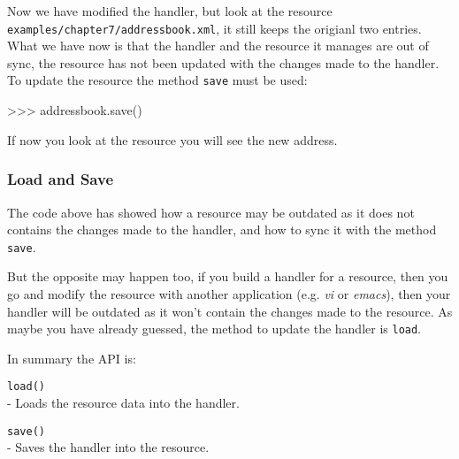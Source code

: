 Now we have modified the handler, but look at the resource
{\tt examples/chapter7/addressbook.xml}, it still keeps the origianl two
entries. What we have now is that the handler and the resource it manages
are out of sync, the resource has not been updated with the changes made
to the handler. To update the resource the method {\tt save} must be used:

\begin{code}
    >>> addressbook.save()
\end{code}

If now you look at the resource you will see the new address.


\subsubsection{Load and Save}

The code above has showed how a resource may be outdated as it does not
contains the changes made to the handler, and how to sync it with the
method {\tt save}.

But the opposite may happen too, if you build a handler for a resource,
then you go and modify the resource with another application (e.g. {\em vi}
or {\em emacs}), then your handler will be outdated as it won't contain the
changes made to the resource. As maybe you have already guessed, the method
to update the handler is {\tt load}.

In summary the API is:

\begin{api}
  {\tt load()}\\
  - Loads the resource data into the handler.

  {\tt save()}\\
  - Saves the handler into the resource.
\end{api}


\subsubsection{}
